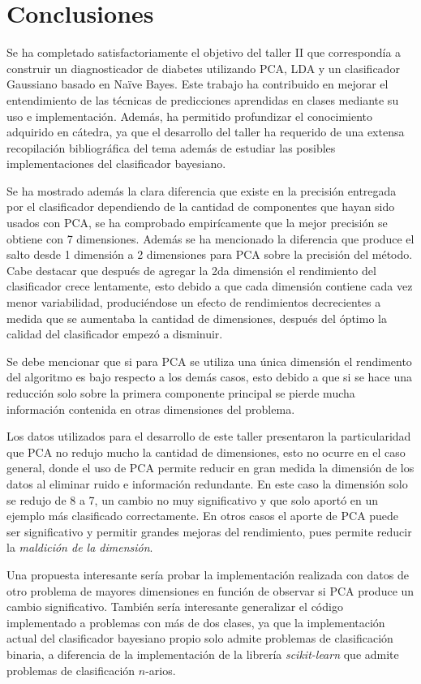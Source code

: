 \documentclass[letter, titlepage, 10pt]{article}
\begin{document}
\section{Conclusiones}
Se ha completado satisfactoriamente el objetivo del taller II que correspondía a construir un diagnosticador de diabetes utilizando PCA, LDA y un clasificador Gaussiano basado en Naïve Bayes. Este trabajo ha contribuido en mejorar el entendimiento de las técnicas de predicciones aprendidas en clases mediante su uso e implementación. Además, ha permitido profundizar el conocimiento adquirido en cátedra, ya que el desarrollo del taller ha requerido de una extensa recopilación bibliográfica del tema además de estudiar las posibles implementaciones del clasificador bayesiano.

Se ha mostrado además la clara diferencia que existe en la precisión entregada por el clasificador dependiendo de la cantidad de componentes que hayan sido usados con PCA, se ha comprobado empirícamente que la mejor precisión se obtiene con 7 dimensiones. Además se ha mencionado la diferencia que produce el salto desde 1 dimensión a 2 dimensiones para PCA sobre la precisión del método. Cabe destacar que después de agregar la 2da dimensión el rendimiento del clasificador crece lentamente, esto debido a que cada dimensión contiene cada vez menor variabilidad, produciéndose un efecto de rendimientos decrecientes a medida que se aumentaba la cantidad de dimensiones, después del óptimo la calidad del clasificador empezó a disminuir.

Se debe mencionar que si para PCA se utiliza una única dimensión el rendimento del algoritmo es bajo respecto a los demás casos, esto debido a que si se hace una reducción solo sobre la primera componente principal se pierde mucha información contenida en otras dimensiones del problema.

Los datos utilizados para el desarrollo de este taller presentaron la particularidad que PCA no redujo mucho la cantidad de dimensiones, esto no ocurre en el caso general, donde el uso de PCA permite reducir en gran medida la dimensión de los datos al eliminar ruido e información redundante. En este caso la dimensión solo se redujo de 8 a 7, un cambio no muy significativo y que solo aportó en un ejemplo más clasificado correctamente. En otros casos el aporte de PCA puede ser significativo y permitir grandes mejoras del rendimiento, pues permite reducir la \textit{maldición de la dimensión}.

Una propuesta interesante sería probar la implementación realizada con datos de otro problema de mayores dimensiones en función de observar si PCA produce un cambio significativo. También sería interesante generalizar el código implementado a problemas con más de dos clases, ya que la implementación actual del clasificador bayesiano propio solo admite problemas de clasificación binaria, a diferencia de la implementación de la librería \textit{scikit-learn} que admite problemas de clasificación $n$-arios.
\end{document}
